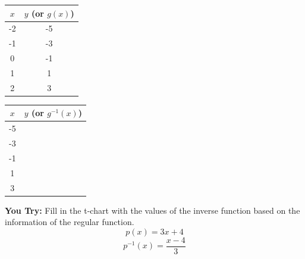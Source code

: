 \documentclass[12pt]{article}
\begin{document}
\begin{multicols}{2}
\begin{center}
	\begin{tabular}{c | c}
	
		\hspace{.5cm}$x$ \hspace{.5cm}& $y$ (or $g(x)$) \\ \hline
	
		-2 & -5\\
		
		-1 & -3\\
		
		0 & -1 \\
		
		1 & 1 \\
		
		2 & 3 \\
	
	\end{tabular}
	
		\begin{tabular}{c | c}
	
		\hspace{.5cm}$x$\hspace{.5cm} & $y$ (or $g^{-1}(x)$) \\ \hline
		
		-5 & \\
		
		-3 & \\
		
		-1 &  \\
		
		1 & \\
		
		3 & \\
	
	\end{tabular}

\end{center}
\end{multicols}

\hrulefill

\textbf{You Try:} Fill in the t-chart with the values of the inverse function based on the information of the regular function.\\

 $$p(x)=3x+4$$
 $$p^{-1}(x)=\frac{x-4}{3}$$\\
\end{document}
